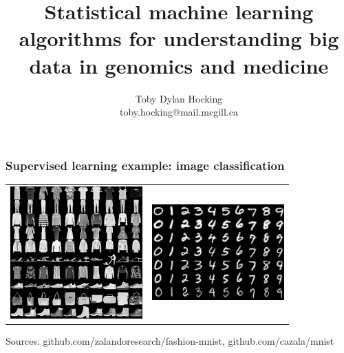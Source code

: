 \documentclass{beamer}
\begin{document}
\title{Statistical machine 
learning algorithms for 
understanding big data in
  genomics and medicine}

\author{
  Toby Dylan Hocking\\
  toby.hocking@mail.mcgill.ca
}

\maketitle

\begin{frame}
  \frametitle{Supervised learning example: image classification}
  \begin{tabular}{cc}
  \includegraphics[width=2in]{fashion-mnist-sprite-some}  &
  \includegraphics[width=2in]{mnist-digits}
  \end{tabular}
  


  Sources: github.com/zalandoresearch/fashion-mnist, github.com/cazala/mnist
\end{frame}
\end{document}
